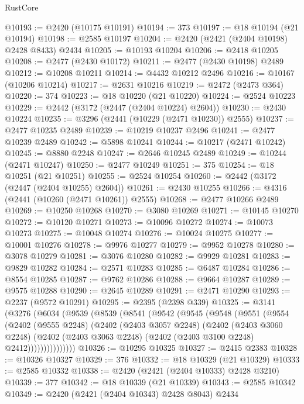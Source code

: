 \begin{lexlean}{RustCore}
\begin{coremodule}
@10193 := @2420 (@10175 @10191)
@10194 := 373
@10197 := @18 @10194 (@21 @10194)
@10198 := @2585 @10197
@10204 := @2420 (@2421 (@2404 @10198) @2428 @8433) @2434
@10205 := @10193 @10204
@10206 := @2418 @10205
@10208 := @2477 (@2430 @10172)
@10211 := @2477 (@2430 @10198) @2489
@10212 := @10208 @10211
@10214 := @4432 @10212 @2496
@10216 := @10167 (@10206 @10214)
@10217 := @2631 @10216
@10219 := @2472 (@2473 @364)
@10220 := 374
@10223 := @18 @10220 (@21 @10220)
@10224 := @2524 @10223
@10229 := @2442 (@3172 (@2447 (@2404 @10224) @2604))
@10230 := @2430 @10224
@10235 := @3296 (@2441 (@10229 (@2471 @10230)) @2555)
@10237 := @2477 @10235 @2489
@10239 := @10219 @10237 @2496
@10241 := @2477 @10239 @2489
@10242 := @5898 @10241
@10244 := @10217 (@2471 @10242)
@10245 := @8880 @2248
@10247 := @2646 @10245 @2489
@10249 := @10244 (@2471 @10247)
@10250 := @2477 @10249
@10251 := 375
@10254 := @18 @10251 (@21 @10251)
@10255 := @2524 @10254
@10260 := @2442 (@3172 (@2447 (@2404 @10255) @2604))
@10261 := @2430 @10255
@10266 := @4316 (@2441 (@10260 (@2471 @10261)) @2555)
@10268 := @2477 @10266 @2489
@10269 := @10250 @10268
@10270 := @3080 @10269
@10271 := @10145 @10270
@10272 := @10120 @10271
@10273 := @10096 @10272
@10274 := @10073 @10273
@10275 := @10048 @10274
@10276 := @10024 @10275
@10277 := @10001 @10276
@10278 := @9976 @10277
@10279 := @9952 @10278
@10280 := @3078 @10279
@10281 := @3076 @10280
@10282 := @9929 @10281
@10283 := @9829 @10282
@10284 := @2571 @10283
@10285 := @6487 @10284
@10286 := @8554 @10285
@10287 := @9762 @10286
@10288 := @9664 @10287
@10289 := @9575 @10288
@10290 := @2645 @10289
@10291 := @2471 @10290
@10293 := @2237 (@9572 @10291)
@10295 := @2395 (@2398 @339)
@10325 := @3141
    (@3276
      (@6034
        (@9539
          (@8539
            (@8541
              (@9542
                (@9545
                  (@9548
                    (@9551
                      (@9554
                        (@2402
                          (@9555 @2248)
                          (@2402
                            (@2403 @3057 @2248)
                            (@2402
                              (@2403 @3060 @2248)
                              (@2402
                                (@2403 @3063 @2248)
                                (@2402 (@2403 @3100 @2248) @2412)))))))))))))))
@10326 := @10295 @10325
@10327 := @2415 @2383
@10328 := @10326 @10327
@10329 := 376
@10332 := @18 @10329 (@21 @10329)
@10333 := @2585 @10332
@10338 := @2420 (@2421 (@2404 @10333) @2428 @3210)
@10339 := 377
@10342 := @18 @10339 (@21 @10339)
@10343 := @2585 @10342
@10349 := @2420 (@2421 (@2404 @10343) @2428 @8043) @2434

\end{coremodule}
\end{lexlean}
